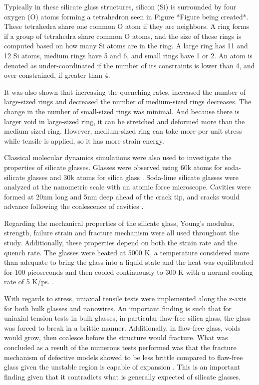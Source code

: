Typically in these silicate glass structures, silicon (Si) is surrounded by four oxygen (O) atoms forming a tetrahedron seen in Figure *Figure being created*. These tetrahedra share one common O atom if they are neighbors. A ring forms if a group of tetrahedra share common O atoms, and the size of these rings is computed based on how many Si atoms are in the ring. A large ring has 11 and 12 Si atoms, medium rings have 5 and 6, and small rings have 1 or 2. An atom is denoted as under-coordinated if the number of its constraints is lower than 4, and over-constrained, if greater than 4. \cite{pedone2015dynamics}

It was also shown that increasing the quenching rates, increased the number of large-sized rings and decreased the number of medium-sized rings decreases. The change in the number of small-sized rings was minimal. And because there is larger void in large-sized ring, it can be stretched and deformed more than the medium-sized ring. However, medium-sized ring can take more per unit stress while tensile is applied, so it has more strain energy.

Classical molecular dynamics simulations were also used to investigate the properties of silicate glasses. Glasses were observed using 60k atoms for soda-silicate glasses and 30k atoms for silica glass . Soda-lime silicate glasses were analyzed at the nanometric scale with an atomic force microscope. Cavities were formed at 20nm long and 5nm deep ahead of the crack tip, and cracks would advance following the coalescence of cavities .

Regarding the mechanical properties of the silicate glass, Young's modulus, strength, failure strain and fracture mechanism were all used throughout the study.  Additionally, these properties depend on both the strain rate and the quench rate. The glasses were heated at 5000 K, a temperature considered more than adequate to bring the glass into a liquid state and the heat was equilibrated for 100 picoseconds and then cooled continuously to 300 K with a normal cooling rate of 5 K/ps. .

With regards to stress, uniaxial tensile tests were implemented along the z-axis for both bulk glasses and nanowires. An important finding is such that for uniaxial tension tests in bulk glasses, in particular flaw-free silica glass, the glass was forced to break in a brittle manner. Additionally, in flaw-free glass, voids would grow, then coalesce before the structure would fracture. What was concluded as a result of the numerous tests performed was that the fracture mechanism of defective models showed to be less brittle compared to flaw-free glass given the unstable region is capable of expansion . This is an important finding given that it contradicts what is generally expected of silicate glasses.\cite{radialDistribution}

